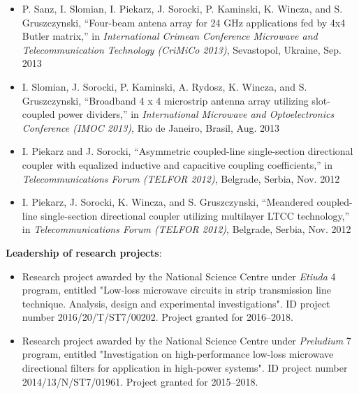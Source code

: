 \begin{itemize}[nosep]
\item P. Sanz, I. Slomian, I. Piekarz, J. Sorocki, P. Kaminski, K. Wincza, and S. Gruszczynski,
“Four-beam antena array for 24 GHz applications fed by 4x4 Butler matrix,” in \textit{International Crimean Conference Microwave and Telecommunication Technology (CriMiCo 2013)}, Sevastopol,
Ukraine, Sep. 2013
\item I. Slomian, J. Sorocki, P. Kaminski, A. Rydosz, K. Wincza, and S. Gruszczynski, “Broadband 4 x 4 microstrip antenna array utilizing slot-coupled power dividers,” in \textit{International Microwave and Optoelectronics Conference (IMOC 2013)}, Rio de Janeiro, Brasil, Aug. 2013
\item I. Piekarz and J. Sorocki, “Asymmetric coupled-line single-section directional coupler with
equalized inductive and capacitive coupling coefficients,” in \textit{Telecommunications Forum (TELFOR 2012)}, Belgrade, Serbia, Nov. 2012
\item I. Piekarz, J. Sorocki, K. Wincza, and S. Gruszczynski, “Meandered coupled-line single-section directional coupler utilizing multilayer LTCC technology,” in \textit{Telecommunications Forum (TELFOR 2012)}, Belgrade, Serbia, Nov. 2012
\end{itemize}
\vspace*{1cm} %

\noindent \textbf{Leadership of research projects}:
\begin{itemize}[nosep]
\item Research project awarded by the National Science Centre under \textit{Etiuda} 4 program, entitled "Low-loss microwave circuits in strip transmission line technique. Analysis, design and experimental investigations". ID project number 2016/20/T/ST7/00202. Project granted for 2016--2018.
\item Research project awarded by the National Science Centre under \textit{Preludium} 7 program, entitled "Investigation on high-performance low-loss microwave directional filters for application in high-power systems". ID project number 2014/13/N/ST7/01961. Project granted for 2015--2018.
\end{itemize}
\vspace*{1cm} %

